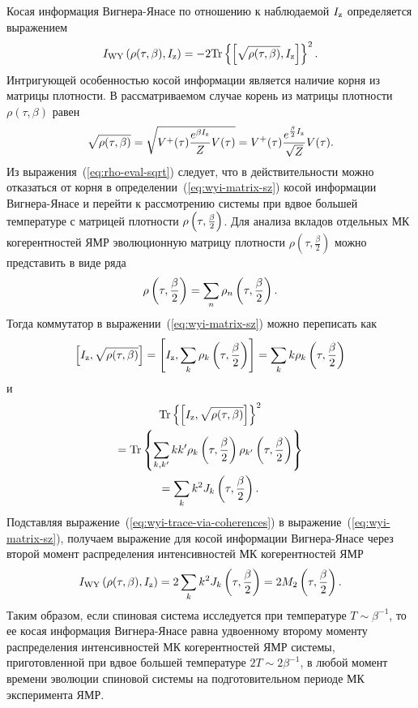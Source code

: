 Косая информация Вигнера-Янасе по отношению к наблюдаемой $I_\mathrm{z}$ определяется выражением~\cite{Wigner1963}
%
\begin{equation}\label{eq:wyi-matrix-sz}
  I_\mathrm{WY}\left( \rho(\tau,\beta),I_\mathrm{z} \right)
  = -2 \mathrm{Tr} \left\{ \left[\sqrt{\rho(\tau,\beta)}, I_\mathrm{z}\right] \right\}^2.
\end{equation}
%
Интригующей особенностью косой информации
является наличие корня из матрицы плотности.
В рассматриваемом случае корень из матрицы плотности $\rho(\tau,\beta)$ равен
%
\begin{equation}\label{eq:rho-eval-sqrt}
  \sqrt{\rho(\tau,\beta)}
  = \sqrt{V^+(\tau)\frac{e^{\beta I_\mathrm{z}}}{Z}V(\tau)}
  = V^+(\tau) \frac{e^{\frac{\beta}{2}I_\mathrm{z}}}{\sqrt{Z}}V(\tau).
\end{equation}
%
Из выражения~(\ref{eq:rho-eval-sqrt}) следует,
что в действительности можно отказаться от корня
в определении~(\ref{eq:wyi-matrix-sz}) косой информации Вигнера-Янасе
и перейти к рассмотрению системы при вдвое большей температуре
с матрицей плотности $\rho\left( \tau,\frac \beta 2 \right)$.
Для анализа вкладов отдельных МК когерентностей ЯМР эволюционную матрицу плотности
$\rho(\tau,\frac \beta 2)$ можно представить в виде ряда~\cite{Feldman1996}
%
\begin{equation}
  \rho\left( \tau,\frac \beta 2 \right) = \sum_n \rho_{n}\left( \tau,\frac \beta 2 \right).
\end{equation}
%
Тогда коммутатор в выражении~(\ref{eq:wyi-matrix-sz}) можно переписать как
%
\begin{equation}
    \left[I_\mathrm{z}, \sqrt{\rho(\tau,\beta)}\right]
    = \left[I_\mathrm{z}, \sum_k \rho_k \left( \tau, \frac{\beta}{2} \right)\right]
    = \sum_k k\rho_k \left( \tau, \frac{\beta}{2} \right)
\end{equation}
%
и
%
\begin{multline}\label{eq:wyi-trace-via-coherences}
  \mathrm{Tr} \left\{ \left[I_\mathrm{z}, \sqrt{\rho(\tau,\beta)}\right] \right\}^2
  \\
  = \mathrm{Tr} \left\{ 
    \sum_{k,k'}kk'
    \rho_k\left( \tau,\frac{\beta}{2} \right)
    \rho_{k'}\left( \tau,\frac{\beta}{2} \right)
   \right\}
  \\
  = \sum_k k^2 J_k\left( \tau,\frac{\beta}{2} \right).
\end{multline}
%
Подставляя выражение~(\ref{eq:wyi-trace-via-coherences}) в выражение~(\ref{eq:wyi-matrix-sz}),
получаем выражение для косой информации Вигнера-Янасе
через второй момент распределения интенсивностей МК когерентностей ЯМР
%
\begin{equation}\label{eq:wyi-via-second-moment}
    I_\mathrm{WY}\left( \rho(\tau, \beta), I_\mathrm{z} \right)
    = 2\sum_k k^2 J_k\left( \tau, \frac{\beta}{2} \right)
    = 2M_2\left( \tau, \frac{\beta}{2} \right).
\end{equation}
%
Таким образом,
если спиновая система исследуется при температуре $T\sim\beta^{-1}$,
то ее косая информация Вигнера-Янасе равна удвоенному второму моменту
распределения интенсивностей  МК когерентностей ЯМР системы, приготовленной при вдвое большей температуре $2T \sim 2\beta^{-1}$,
в любой момент времени эволюции спиновой системы на подготовительном периоде МК эксперимента ЯМР.


